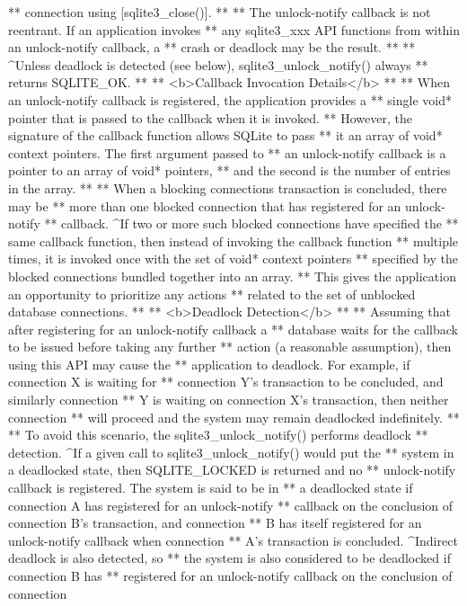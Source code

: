 \begin{Codex}[label=sqlite3.h,numbers=left]
{** connection using [sqlite3_close()].
**
** The unlock-notify callback is not reentrant. If an application invokes
** any sqlite3_xxx API functions from within an unlock-notify callback, a
** crash or deadlock may be the result.
**
** ^Unless deadlock is detected (see below), sqlite3_unlock_notify() always
** returns SQLITE_OK.
**
** <b>Callback Invocation Details</b>
**
** When an unlock-notify callback is registered, the application provides a 
** single void* pointer that is passed to the callback when it is invoked.
** However, the signature of the callback function allows SQLite to pass
** it an array of void* context pointers. The first argument passed to
** an unlock-notify callback is a pointer to an array of void* pointers,
** and the second is the number of entries in the array.
**
** When a blocking connections transaction is concluded, there may be
** more than one blocked connection that has registered for an unlock-notify
** callback. ^If two or more such blocked connections have specified the
** same callback function, then instead of invoking the callback function
** multiple times, it is invoked once with the set of void* context pointers
** specified by the blocked connections bundled together into an array.
** This gives the application an opportunity to prioritize any actions 
** related to the set of unblocked database connections.
**
** <b>Deadlock Detection</b>
**
** Assuming that after registering for an unlock-notify callback a 
** database waits for the callback to be issued before taking any further
** action (a reasonable assumption), then using this API may cause the
** application to deadlock. For example, if connection X is waiting for
** connection Y's transaction to be concluded, and similarly connection
** Y is waiting on connection X's transaction, then neither connection
** will proceed and the system may remain deadlocked indefinitely.
**
** To avoid this scenario, the sqlite3_unlock_notify() performs deadlock
** detection. ^If a given call to sqlite3_unlock_notify() would put the
** system in a deadlocked state, then SQLITE_LOCKED is returned and no
** unlock-notify callback is registered. The system is said to be in
** a deadlocked state if connection A has registered for an unlock-notify
** callback on the conclusion of connection B's transaction, and connection
** B has itself registered for an unlock-notify callback when connection
** A's transaction is concluded. ^Indirect deadlock is also detected, so
** the system is also considered to be deadlocked if connection B has
** registered for an unlock-notify callback on the conclusion of connection
}
\end{Codex}
